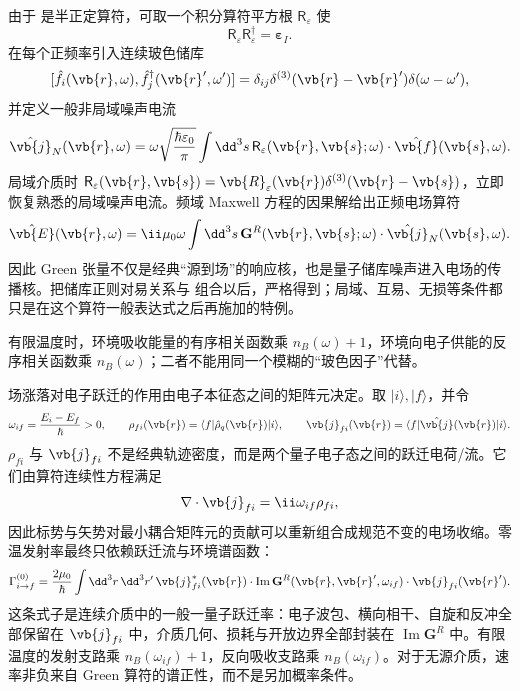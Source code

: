 由于 是半正定算符，可取一个积分算符平方根
$\mathsf R_\varepsilon$ 使
\[
\mathsf R_\varepsilon\mathsf R_\varepsilon^\dagger
=\boldsymbol\varepsilon_I.
\]
在每个正频率引入连续玻色储库
\begin{equation}
{
[\hat f_i(\vb{r},\omega),\hat f_j^\dagger(\vb{r}',\omega')]
=\delta_{ij}\delta^{(3)}(\vb{r}-\vb{r}')\delta(\omega-\omega'),}
\label{eq:macqed_noise_boson_commutator}
\end{equation}
并定义一般非局域噪声电流
\begin{equation}
{
\hat{\vb{j}}_{N}(\vb{r},\omega)
=\omega\sqrt{\frac{\hbar\varepsilon_0}{\pi}}
\int\dd^3s\,
\mathsf R_\varepsilon(\vb{r},\vb{s};\omega)
\cdot\hat{\vb{f}}(\vb{s},\omega).}
\label{eq:macqed_noise_current_definition}
\end{equation}
局域介质时
$\mathsf R_\varepsilon(\vb{r},\vb{s})=
\vb{R}_\varepsilon(\vb{r})\delta^{(3)}(\vb{r}-\vb{s})$，立即恢复熟悉的局域噪声电流。频域 Maxwell 方程的因果解给出正频电场算符
\begin{equation}
{
\hat{\vb{E}}(\vb{r},\omega)
=\ii\mu_0\omega\int\dd^3s\,
\mathbf G^R(\vb{r},\vb{s};\omega)\cdot
\hat{\vb{j}}_{N}(\vb{s},\omega).}
\label{eq:macqed_field_from_noise_current}
\end{equation}
因此 Green 张量不仅是经典“源到场”的响应核，也是量子储库噪声进入电场的传播核。把储库正则对易关系与 组合以后，严格得到；局域、互易、无损等条件都只是在这个算符一般表达式之后再施加的特例。

有限温度时，环境吸收能量的有序相关函数乘 $n_B(\omega)+1$，环境向电子供能的反序相关函数乘 $n_B(\omega)$；二者不能用同一个模糊的“玻色因子”代替。

场涨落对电子跃迁的作用由电子本征态之间的矩阵元决定。取 $|i\rangle,|f\rangle$，并令
\[
\omega_{if}=\frac{E_i-E_f}{\hbar}>0,
\qquad
\rho_{fi}(\vb{r})=\langle f|\hat\rho_q(\vb{r})|i\rangle,
\qquad
\vb{j}_{fi}(\vb{r})=\langle f|\hat{\vb{j}}(\vb{r})|i\rangle.
\]
$\rho_{fi}$ 与 $\vb{j}_{fi}$ 不是经典轨迹密度，而是两个量子电子态之间的跃迁电荷/流。它们由算符连续性方程满足
\[
\nabla\cdot\vb{j}_{fi}=\ii\omega_{if}\rho_{fi},
\]
因此标势与矢势对最小耦合矩阵元的贡献可以重新组合成规范不变的电场收缩。零温发射率最终只依赖跃迁流与环境谱函数：
\begin{equation}
{
\Gamma_{i\to f}^{(0)}
=
\frac{2\mu_0}{\hbar}
\int\dd^3 r\,\dd^3 r'\,
\vb{j}_{fi}^{*}(\vb{r})\cdot
\operatorname{Im}\mathbf G^R(\vb{r},\vb{r}',\omega_{if})\cdot
\vb{j}_{fi}(\vb{r}').}
\label{eq:quantum_transition_current_green_rate}
\end{equation}
这条式子是连续介质中的一般一量子跃迁率：电子波包、横向相干、自旋和反冲全部保留在 $\vb{j}_{fi}$ 中，介质几何、损耗与开放边界全部封装在 $\operatorname{Im}\mathbf G^R$ 中。有限温度的发射支路乘 $n_B(\omega_{if})+1$，反向吸收支路乘 $n_B(\omega_{if})$。对于无源介质，速率非负来自 Green 算符的谱正性，而不是另加概率条件。

